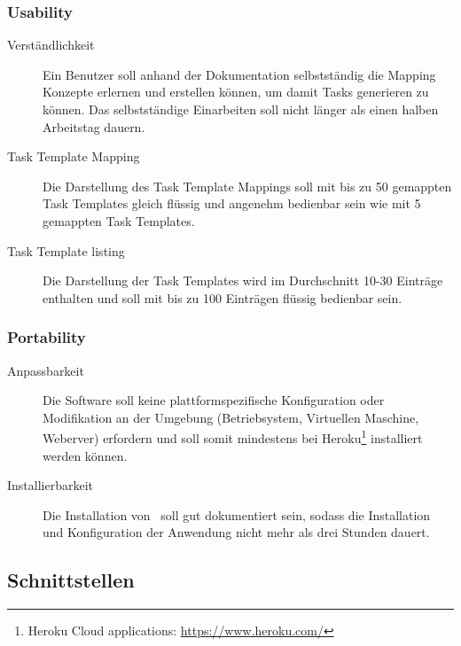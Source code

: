 		\subsubsection{Usability}
		\begin{description}
			\item[Verständlichkeit] Ein Benutzer soll anhand der Dokumentation selbstständig die Mapping Konzepte erlernen und erstellen können, um damit Tasks generieren zu können. Das selbstständige Einarbeiten soll nicht länger als einen halben Arbeitstag dauern.
			\item[Task Template Mapping] Die Darstellung des Task Template Mappings soll mit bis zu 50 gemappten Task Templates gleich flüssig und angenehm bedienbar sein wie mit 5 gemappten Task Templates.
			\item[Task Template listing] Die Darstellung der Task Templates wird im Durchschnitt 10-30 Einträge enthalten und soll mit bis zu 100 Einträgen flüssig bedienbar sein.
		\end{description}

		
		\subsubsection{Portability}
		\begin{description}
			\item[Anpassbarkeit] Die Software soll keine plattformspezifische Konfiguration oder Modifikation an der Umgebung (Betriebsystem, Virtuellen Maschine, Weberver) erfordern und soll somit mindestens bei Heroku\footnote{Heroku Cloud applications: \url{https://www.heroku.com/}} installiert werden können.
			\item[Installierbarkeit] Die Installation von \eeppi\ soll gut dokumentiert sein, sodass die Installation und Konfiguration der Anwendung nicht mehr als drei Stunden dauert.
		\end{description}

	\subsection{Schnittstellen}
